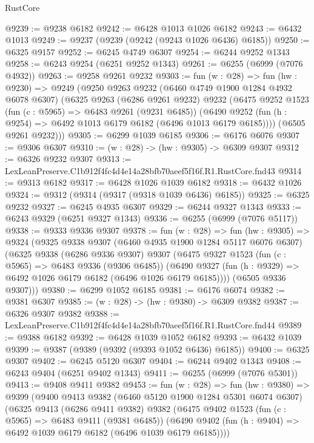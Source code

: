 \begin{lexlean}{RustCore}
\begin{coremodule}
@9239 := @9238 @6182
@9242 := @6428 @1013 @1026 @6182
@9243 := @6432 @1013
@9249 := @9237 (@9239 (@9242 (@9243 @1026 @6436) @6185))
@9250 := @6325 @9157
@9252 := @6245 @4749 @6307
@9254 := @6244 @9252 @1343
@9258 := @6243 @9254 (@6251 @9252 @1343)
@9261 := @6255 (@6999 (@7076 @4932))
@9263 := @9258 @9261 @9232
@9303 := fun (w : @28) =>
  fun (hw : @9230) =>
  @9249
    (@9250
      @9263
      @9232
      (@6460 @4749 @1900 @1284 @4932 @6078 @6307)
      (@6325
        @9263
        (@6286 @9261 @9232)
        @9232
        (@6475
          @9252
          @1523
          (fun (c : @5965) => @6483 @9261 (@9231 @6485))
          (@6490 @9252 (fun (h : @9254) => @6492 @1013 @6179 @6182 (@6496 @1013 @6179 @6185))))
        (@6505 @9261 @9232)))
@9305 := @6299 @1039 @6185
@9306 := @6176 @6076
@9307 := @9306 @6307
@9310 := (w : @28) -> (hw : @9305) -> @6309 @9307
@9312 := @6326 @9232 @9307
@9313 := LexLeanPreserve.C1b912f4fc4d4e14a28bfb70aeef5f16f.R1.RustCore.fnd43
@9314 := @9313 @6182
@9317 := @6428 @1026 @1039 @6182
@9318 := @6432 @1026
@9324 := @9312 (@9314 (@9317 (@9318 @1039 @6436) @6185))
@9325 := @6325 @9232
@9327 := @6245 @4935 @6307
@9329 := @6244 @9327 @1343
@9333 := @6243 @9329 (@6251 @9327 @1343)
@9336 := @6255 (@6999 (@7076 @5117))
@9338 := @9333 @9336 @9307
@9378 := fun (w : @28) =>
  fun (hw : @9305) =>
  @9324
    (@9325
      @9338
      @9307
      (@6460 @4935 @1900 @1284 @5117 @6076 @6307)
      (@6325
        @9338
        (@6286 @9336 @9307)
        @9307
        (@6475
          @9327
          @1523
          (fun (c : @5965) => @6483 @9336 (@9306 @6485))
          (@6490 @9327 (fun (h : @9329) => @6492 @1026 @6179 @6182 (@6496 @1026 @6179 @6185))))
        (@6505 @9336 @9307)))
@9380 := @6299 @1052 @6185
@9381 := @6176 @6074
@9382 := @9381 @6307
@9385 := (w : @28) -> (hw : @9380) -> @6309 @9382
@9387 := @6326 @9307 @9382
@9388 := LexLeanPreserve.C1b912f4fc4d4e14a28bfb70aeef5f16f.R1.RustCore.fnd44
@9389 := @9388 @6182
@9392 := @6428 @1039 @1052 @6182
@9393 := @6432 @1039
@9399 := @9387 (@9389 (@9392 (@9393 @1052 @6436) @6185))
@9400 := @6325 @9307
@9402 := @6245 @5120 @6307
@9404 := @6244 @9402 @1343
@9408 := @6243 @9404 (@6251 @9402 @1343)
@9411 := @6255 (@6999 (@7076 @5301))
@9413 := @9408 @9411 @9382
@9453 := fun (w : @28) =>
  fun (hw : @9380) =>
  @9399
    (@9400
      @9413
      @9382
      (@6460 @5120 @1900 @1284 @5301 @6074 @6307)
      (@6325
        @9413
        (@6286 @9411 @9382)
        @9382
        (@6475
          @9402
          @1523
          (fun (c : @5965) => @6483 @9411 (@9381 @6485))
          (@6490 @9402 (fun (h : @9404) => @6492 @1039 @6179 @6182 (@6496 @1039 @6179 @6185))))

\end{coremodule}
\end{lexlean}
